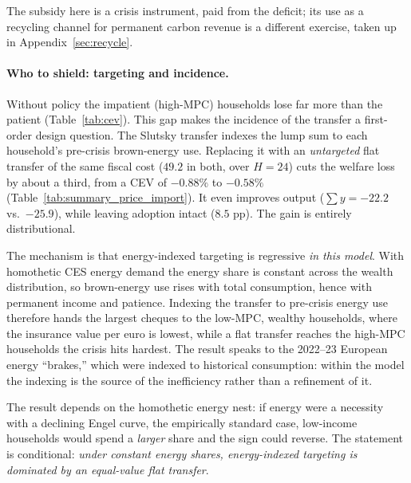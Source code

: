 The subsidy here is a crisis instrument, paid from the deficit; its use as a recycling channel for permanent carbon revenue is a different exercise, taken up in Appendix~\ref{sec:recycle}.

\paragraph{Who to shield: targeting and incidence.}\label{sec:flat}

Without policy the impatient (high-MPC) households lose far more than the patient
(Table~\ref{tab:cev}). This gap makes the incidence of the transfer a first-order
design question. The Slutsky transfer indexes the lump sum to each household's
pre-crisis brown-energy use. Replacing it with an \emph{untargeted} flat transfer
of the same fiscal cost ($49.2$ in both, over $H=24$) cuts the welfare
loss by about a third, from a CEV of $-0.88\%$ to $-0.58\%$ (Table~\ref{tab:summary_price_import}).
It even improves output ($\sum y=-22.2$ vs.\ $-25.9$), while leaving adoption
intact ($8.5$ pp). The gain is entirely distributional.

The mechanism is that energy-indexed targeting is regressive \emph{in this model}.
With homothetic CES energy demand the energy share is constant across the wealth
distribution, so brown-energy use rises with total consumption, hence with
permanent income and patience. Indexing the transfer to pre-crisis energy use
therefore hands the largest cheques to the low-MPC, wealthy households, where the
insurance value per euro is lowest, while a flat transfer reaches the high-MPC
households the crisis hits hardest. The result speaks to the 2022--23 European energy
``brakes,'' which were indexed to historical consumption: within the model the
indexing is the source of the inefficiency rather than a refinement of it.

The result depends on the homothetic energy nest: if
energy were a necessity with a declining Engel curve, the empirically standard
case, low-income households would spend a \emph{larger} share and the sign could
reverse. The statement is conditional: \emph{under constant energy shares,
energy-indexed targeting is dominated by an equal-value flat transfer}.



